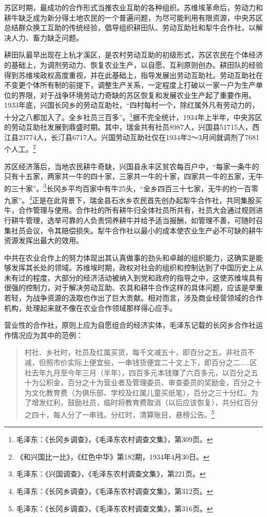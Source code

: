 苏区时期，最成功的合作形式当推农业互助的各种组织。苏维埃革命后，劳动力和耕牛缺乏成为新分得土地农民的一个普遍问题，为尽可能利用有限资源，中央苏区总结群众换工互助的传统经验，倡导组织耕田队、劳动互助社和犁牛合作社，以解决人力、畜力缺乏问题。


耕田队最早出现在上杭才溪区，是农村劳动互助的初级形式，苏区农民在个体经济的基础上，为调剂劳动力、恢复农业生产，以自愿、互利原则创办。耕田队的经验得到苏维埃政权高度重视，并在此基础上，指导发展出劳动互助社。劳动互助社在不变更个体所有制的前提下，调整生产关系，一定程度上打破以一家一户为生产单位的界限，对于战争环境劳动力奇缺的苏区恢复和发展农业生产起了重要作用。1933年底，兴国长冈乡的劳动互助社，“四村每村一个，除红属外凡有劳动力的，十分之八都加入了。全乡社员三百多”。\footnote{毛泽东：《长冈乡调查》，《毛泽东农村调查文集》，第309页。}据不完全统计，1934年上半年，中央苏区的劳动互助社发展到鼎盛时期。其中，瑞金共有社员8987人，兴国县51715人，西江县23774人，长汀县6717人。兴国劳动互助社仅在1934年2～3月间就调剂了7681个人工。\footnote{《和兴国比一比》，《红色中华》第182期，1934年4月30日。}


苏区经济落后，当地农民耕牛奇缺，兴国县永丰区贫农每百户中，“每家一条牛的只有十五家，两家共一牛的四十家，三家共一牛的十家，四家共一牛的五家，无牛的三十家”。\footnote{毛泽东：《兴国调查》，《毛泽东农村调查文集》，第221页。}长冈乡平均百家中有牛25头，“全乡四百三十七家，无牛的约一百零九家”。\footnote{毛泽东：《长冈乡调查》，《毛泽东农村调查文集》，第312页。}正是在此背景下，瑞金县石水乡农民首先创办起犁牛合作社，共同集股买牛，合作管理与使用。合作社的所有耕牛归全体社员所共有，社员大会通过规则进行耕牛管理，选举可靠的人负责饲养耕牛并给予适当报酬，如管理不善，可随时召集社员会议，令其赔偿损失。犁牛合作社以最小的成本使农业生产必不可缺的耕牛资源发挥出最大的效用。


中共在农业合作上的努力体现出其认真做事的劲头和卓越的组织能力，这确实是能够发挥其长处的领域。苏维埃时期，政权对社会的组织和控制达到了中国历史上从未有过的程度，大部分的经济活动被纳入到党和政府的指导之中，这使苏维埃具有很强的控制力，对于解决劳动互助、农具和耕牛合作这样的具体问题，应该是举重若轻，为战争资源的汲取也作出了巨大贡献。相对而言，涉及商业经营领域的合作机构，处理起来就不像在农业合作领域那样得心应手。


营业性的合作社，原则上应为自愿组合的经济实体，毛泽东记载的长冈乡合作社运作情况应为其中的范例：

\begin{quote}

村社、乡社时，社员及红属买货，每千文减五十，即百分之五。非社员不减，但照市价实际上便宜些，一串钱货便宜二十文上下，即百分之二……区社去年九月至今年三月（半年），四百多元本钱赚了六百多元，以百分之五十为公积金，百分之十为营业者及管理委员、审查委员的奖励金，百分之十为文化教育费（为俱乐部、学校及红属儿童买纸笔），百分之三十分红。为了增发红利，鼓励社员，临时将教育费取消（以后应该恢复），共分红百分之四十，每人分了一串钱。分红时，清算账目，悬榜公告。\footnote{毛泽东：《长冈乡调查》，《毛泽东农村调查文集》，第316页。}
\end{quote}


